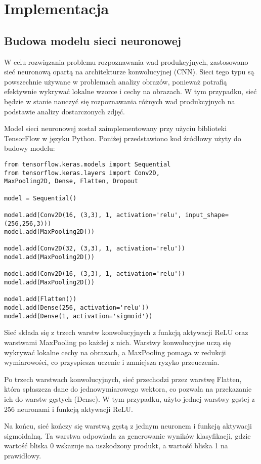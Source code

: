 \chapter{Implementacja}
\section{Budowa modelu sieci neuronowej}

W celu rozwiązania problemu rozpoznawania wad produkcyjnych, zastosowano sieć neuronową opartą na architekturze konwolucyjnej (CNN). Sieci tego typu są powszechnie używane w problemach analizy obrazów, ponieważ potrafią efektywnie wykrywać lokalne wzorce i cechy na obrazach. W tym przypadku, sieć będzie w stanie nauczyć się rozpoznawania różnych wad produkcyjnych na podstawie analizy dostarczonych zdjęć.

Model sieci neuronowej został zaimplementowany przy użyciu biblioteki TensorFlow w języku Python. Poniżej przedstawiono kod źródłowy użyty do budowy modelu:

\begin{verbatim}
from tensorflow.keras.models import Sequential
from tensorflow.keras.layers import Conv2D, 
MaxPooling2D, Dense, Flatten, Dropout

model = Sequential()

model.add(Conv2D(16, (3,3), 1, activation='relu', input_shape=(256,256,3)))
model.add(MaxPooling2D())

model.add(Conv2D(32, (3,3), 1, activation='relu'))
model.add(MaxPooling2D())

model.add(Conv2D(16, (3,3), 1, activation='relu'))
model.add(MaxPooling2D())

model.add(Flatten())
model.add(Dense(256, activation='relu'))
model.add(Dense(1, activation='sigmoid'))
\end{verbatim}

Sieć składa się z trzech warstw konwolucyjnych z funkcją aktywacji ReLU oraz warstwami MaxPooling po każdej z nich. Warstwy konwolucyjne uczą się wykrywać lokalne cechy na obrazach, a MaxPooling pomaga w redukcji wymiarowości, co przyspiesza uczenie i zmniejsza ryzyko przeuczenia.

Po trzech warstwach konwolucyjnych, sieć przechodzi przez warstwę Flatten, która spłaszcza dane do jednowymiarowego wektora, co pozwala na przekazanie ich do warstw gęstych (Dense). W tym przypadku, użyto jednej warstwy gęstej z 256 neuronami i funkcją aktywacji ReLU.

Na końcu, sieć kończy się warstwą gęstą z jednym neuronem i funkcją aktywacji sigmoidalną. Ta warstwa odpowiada za generowanie wyników klasyfikacji, gdzie wartość bliska 0 wskazuje na uszkodzony produkt, a wartość bliska 1 na prawidłowy.

